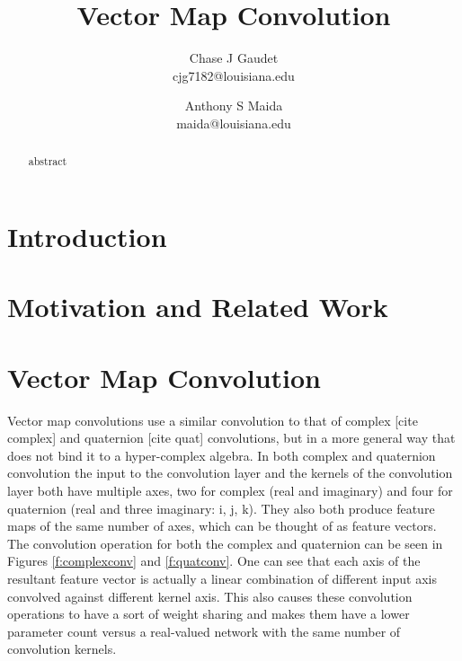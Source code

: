 \documentclass[14pt,a4paper]{article}
\begin{document}
\title{Vector Map Convolution}
\author{Chase J Gaudet \\  cjg7182@louisiana.edu
   \and Anthony S Maida \\  maida@louisiana.edu}
\maketitle

\begin{abstract}
abstract
\end{abstract}

\section{Introduction}


\section{Motivation and Related Work}


\section{Vector Map Convolution}
Vector map convolutions use a similar convolution to that of complex [cite complex] and quaternion [cite quat] convolutions, but in a more general way that does not bind it to a hyper-complex algebra.
In both complex and quaternion convolution the input to the convolution layer and the kernels of the convolution layer both have multiple axes, two for complex (real and imaginary) and four for quaternion (real and three imaginary: i, j, k).
They also both produce feature maps of the same number of axes, which can be thought of as feature vectors.
The convolution operation for both the complex and quaternion can be seen in Figures \ref{f:complexconv} and \ref{f:quatconv}.
One can see that each axis of the resultant feature vector is actually a linear combination of different input axis convolved against different kernel axis.
This also causes these convolution operations to have a sort of weight sharing and makes them have a lower parameter count versus a real-valued network with the same number of convolution kernels.
\end{document}
